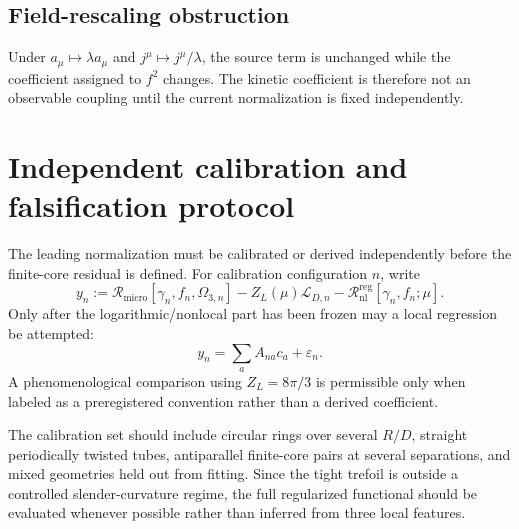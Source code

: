 \documentclass[aps,pre,preprint,notitlepage,nofootinbib,superscriptaddress]{revtex4-2}
\newcommand{\calL}{\mathcal L}
\newcommand{\Rmicro}{\mathscr R_{\mathrm{micro}}}
\newcommand{\ZL}{Z_L}
\newcommand{\Rnl}{\mathscr R_{\mathrm{nl}}^{\mathrm{reg}}}
\begin{document}
\subsection{Field-rescaling obstruction}

Under $a_\mu\mapsto\lambda a_\mu$ and $j^\mu\mapsto j^\mu/\lambda$, the source term is unchanged while the coefficient assigned to $f^2$ changes.  The kinetic coefficient is therefore not an observable coupling until the current normalization is fixed independently.

\section{Independent calibration and falsification protocol}
\label{sec:calibration}

The leading normalization must be calibrated or derived independently before the finite-core residual is defined.  For calibration configuration $n$, write
\begin{equation}
  y_n:=\Rmicro[\gamma_n,f_n,\Omega_{3,n}]
      -\ZL(\mu)\calL_{D,n}
      -\Rnl[\gamma_n,f_n;\mu].
  \label{eq:calibration-v020}
\end{equation}
Only after the logarithmic/nonlocal part has been frozen may a local regression be attempted:
\begin{equation}
  y_n=\sum_aA_{na}c_a+\varepsilon_n.
\end{equation}
A phenomenological comparison using $\ZL=8\pi/3$ is permissible only when labeled as a preregistered convention rather than a derived coefficient.

The calibration set should include circular rings over several $R/D$, straight periodically twisted tubes, antiparallel finite-core pairs at several separations, and mixed geometries held out from fitting.  Since the tight trefoil is outside a controlled slender-curvature regime, the full regularized functional should be evaluated whenever possible rather than inferred from three local features.
\end{document}
